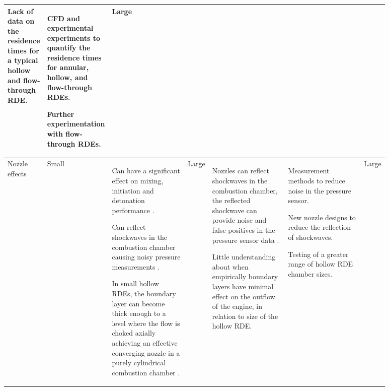 \documentclass{article}
\begin{document}
\begin{landscape}
\begin{table}[ht]
\begin{tabular}{p{0.1\linewidth} | p{0.06\linewidth} | p{0.2\linewidth} | p{0.06\linewidth} | p{0.2\linewidth} | p{0.2\linewidth} | p{0.06\linewidth}}
        \par
        Lack of data on the residence times for a typical hollow and flow-through RDE.
        \par
        &  
        CFD and experimental experiments to quantify the residence times for annular, hollow, and flow-through RDEs.
        \par
        Further experimentation with flow-through RDEs.
        \par
        & \cellcolor[HTML]{D8E2DC} Large\\
        \midrule
		Nozzle effects & \cellcolor[HTML]{FFCAD4} Small &
        Can have a significant effect on mixing, initiation and detonation performance \cite{1Zhang2021}.
        \par
        Can reflect shockwaves in the combustion chamber causing noisy pressure measurements \cite{1Zhang2021}.
        \par
        In small hollow RDEs, the boundary layer can become thick enough to a level where the flow is choked axially achieving an effective converging nozzle in a purely cylindrical combustion chamber \cite{Yokoo2020}.
        \par
        & \cellcolor[HTML]{D8E2DC}  Large &
        Nozzles can reflect shockwaves in the combustion chamber, the reflected shockwave can provide noise and false positives in the pressure sensor data \cite{1Zhang2021}.
        \par
        Little understanding about when empirically boundary layers have minimal effect on the outflow of the engine, in relation to size of the hollow RDE.
        \par
        &  
        Measurement methods to reduce noise in the pressure sensor.
        \par
        New nozzle designs to reduce the reflection of shockwaves.
        \par
        Testing of a greater range of hollow RDE chamber sizes.
        \par
        & \cellcolor[HTML]{D8E2DC} Large\\
		\bottomrule
	\end{tabular}
	\label{table2a}
\end{table}


\end{landscape}
\end{document}

